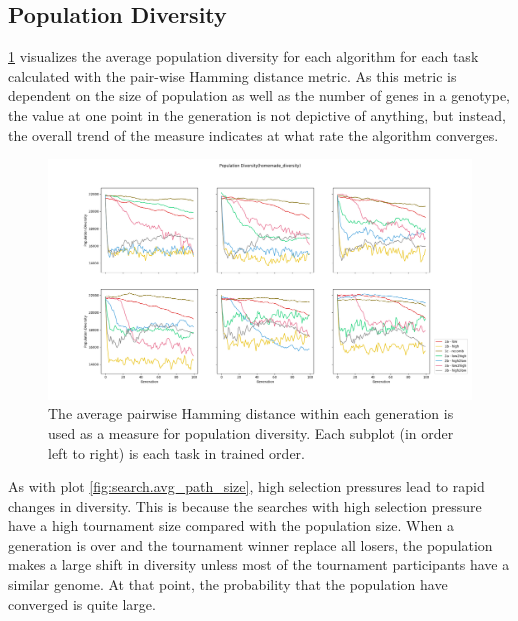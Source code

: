 \subsection{Population Diversity}
\ref{fig:search.hamming_diversity} visualizes the average population diversity for each algorithm for each task calculated with the pair-wise Hamming distance metric. As this metric is dependent on the size of population as well as the number of genes in a genotype, the value at one point in the generation is not depictive of anything, but instead, the overall trend of the measure indicates at what rate the algorithm converges. 

\begin{figure}[p!]%
    \includegraphics[width=1.2\textwidth,center]{Chapters/Experiments/search_algo/figures/Average_population_diversity_reduced_hamming.png}
    \caption{The average pairwise Hamming distance within each generation is used as a measure for population diversity. Each subplot (in order left to right) is each task in trained order.}
    \label{fig:search.hamming_diversity}
\end{figure}

As with plot \ref{fig:search.avg_path_size}, high selection pressures lead to rapid changes in diversity. This is because the searches with high selection pressure have a high tournament size compared with the population size. When a generation is over and  the tournament winner replace all losers, the population makes a large shift in diversity unless most of the tournament participants have a similar genome. At that point, the probability that the population have converged is quite large. 

